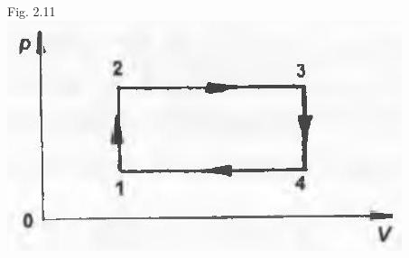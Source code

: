 \documentclass[10pt]{article}
\begin{document}
Fig. 2.11\\
\includegraphics[max width=\textwidth, center]{2025_07_01_5b3ff9fa0d508c8e9f17g-092(1)}
\end{document}
